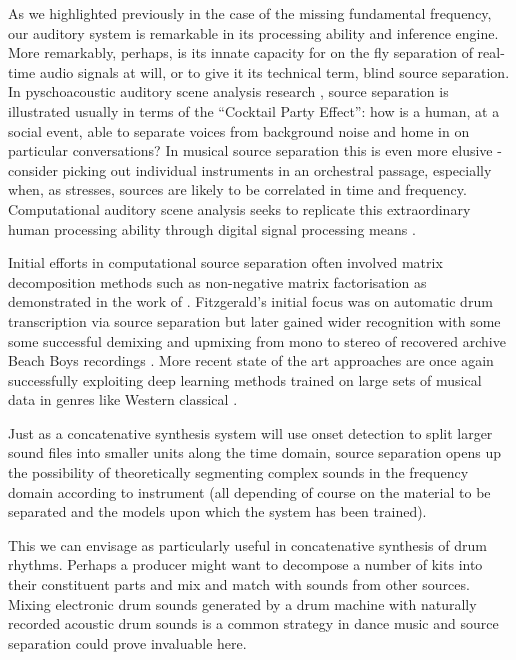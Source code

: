 {{As we highlighted previously in the case of the missing fundamental frequency, our auditory system is remarkable in its processing ability and inference engine. More remarkably,  perhaps, is its innate capacity for on the fly separation of real-time audio signals at will, or to give it its technical term, blind source separation. In pyschoacoustic auditory scene analysis research \citep{Bregman1994}, source separation is illustrated usually in terms of the ``Cocktail Party Effect'': how is a human, at a social event, able to separate voices from background noise and home in on particular conversations? In musical source separation this is even more elusive - consider picking out individual instruments in an orchestral passage, especially when, as \cite{Miron2017a} stresses, sources are likely to be correlated in time and frequency. Computational auditory scene analysis seeks to replicate this extraordinary human processing ability through digital signal processing means \citep{Wang2006}.

Initial efforts in computational source separation often involved matrix decomposition methods such as non-negative matrix factorisation as demonstrated in the work of 
\cite{Fitz2004}. Fitzgerald's initial focus was on automatic drum transcription via source separation but later gained wider recognition with some some successful demixing and upmixing from mono to stereo of recovered archive Beach Boys recordings \citep{Fitz2004}. More recent state of the art approaches are once again successfully exploiting deep learning methods trained on large sets of musical data in genres like Western classical \citep{Miron2017a, Miron2017}.

Just as a concatenative synthesis system will use onset detection to split larger sound files into smaller units along the time domain, source separation opens up the possibility of theoretically segmenting complex sounds in the frequency domain according to instrument (all depending of course on the material to be separated and the models upon which the system has been trained).

This we can envisage as particularly useful in concatenative synthesis of drum rhythms. Perhaps a producer might want to decompose a number of kits into their constituent parts and mix and match with sounds from other sources. Mixing electronic drum sounds generated by a drum machine with naturally recorded acoustic drum sounds is a common strategy in dance music and source separation could prove invaluable here.

}}
